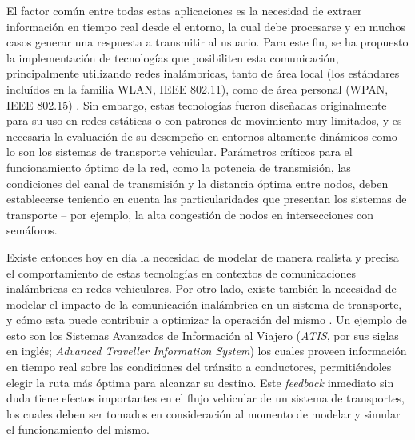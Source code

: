 El factor común entre todas estas aplicaciones es la necesidad de extraer información en tiempo real desde el entorno, la cual debe procesarse y en muchos casos generar una respuesta a transmitir al usuario. Para este fin, se ha propuesto la implementación de tecnologías que posibiliten esta comunicación, principalmente utilizando redes inalámbricas, tanto de área local (los estándares incluídos en la familia WLAN, IEEE 802.11), como de área personal (WPAN, IEEE 802.15) \cite{80211dailey,80215vanet,80211wave}. Sin embargo, estas tecnologías fueron diseñadas originalmente para su uso en redes estáticas o con patrones de movimiento muy limitados, y es necesaria la evaluación de su desempeño en entornos altamente dinámicos como lo son los sistemas de transporte vehicular. Parámetros críticos para el funcionamiento óptimo de la red, como la potencia de transmisión, las condiciones del canal de transmisión y la distancia óptima entre nodos, deben establecerse teniendo en cuenta las particularidades que presentan los sistemas de transporte -- por ejemplo, la alta congestión de nodos en intersecciones con semáforos.

Existe entonces hoy en día la necesidad de modelar de manera realista y precisa el comportamiento de estas tecnologías en contextos de comunicaciones inalámbricas en redes vehiculares. Por otro lado, existe también la necesidad de modelar el impacto de la comunicación inalámbrica en un sistema de transporte, y cómo esta puede contribuir a optimizar la operación del mismo \cite{bidirectionalsimul}. Un ejemplo de esto son los Sistemas Avanzados de Información al Viajero (\textit{ATIS}, por sus siglas en inglés; \textit{Advanced Traveller Information System}) los cuales proveen información en tiempo real sobre las condiciones del tránsito a conductores, permitiéndoles elegir la ruta más óptima para alcanzar su destino. Este \textit{feedback} inmediato sin duda tiene efectos importantes en el flujo vehicular de un sistema de transportes, los cuales deben ser tomados en consideración al momento de modelar y simular el funcionamiento del mismo.